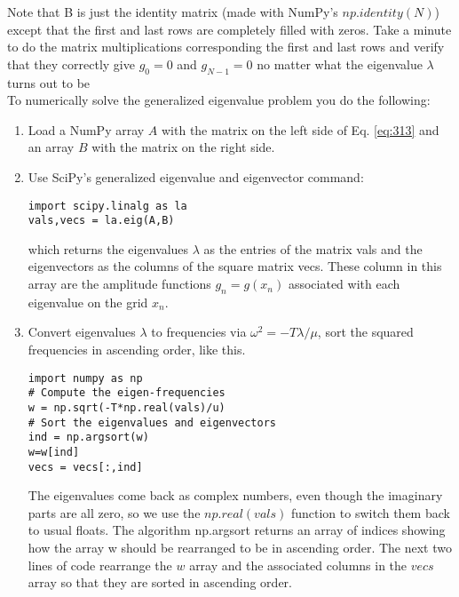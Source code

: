 Note that B is just the identity matrix (made with NumPy\rq s $np.identity(N)$)
except that the first and last rows are completely filled with zeros. Take a minute
to do the matrix multiplications corresponding the first and last rows and verify
that they correctly give $g_0 = 0$ and $g_{N−1} = 0$ no matter what the eigenvalue $\lambda$ turns
out to be \\ 
	To numerically solve the generalized eigenvalue problem you do the following:
	\begin{enumerate}
		\item Load a NumPy array $A$ with the matrix on the left side of Eq. \eqref{eq:313} and an
array $B$ with the matrix on the right side.
\item Use SciPy\rq s generalized eigenvalue and eigenvector command:
\begin{lstlisting}
import scipy.linalg as la
vals,vecs = la.eig(A,B)
\end{lstlisting}
which returns the eigenvalues $\lambda$ as the entries of the matrix vals and the
eigenvectors as the columns of the square matrix vecs. These column
in this array are the amplitude functions $g_n = g(x_n)$ associated with each
eigenvalue on the grid $x_n$.
\item Convert eigenvalues $\lambda$ to frequencies via $\omega^2 = −T \lambda/\mu$, sort the squared
frequencies in ascending order, like this.
\begin{lstlisting}
import numpy as np
# Compute the eigen-frequencies
w = np.sqrt(-T*np.real(vals)/u)
# Sort the eigenvalues and eigenvectors
ind = np.argsort(w)
w=w[ind]
vecs = vecs[:,ind]
\end{lstlisting}
The eigenvalues come back as complex numbers, even though the imaginary parts are all zero, so we use the $np.real(vals)$ function to switch
them back to usual floats. The algorithm np.argsort returns an array of
indices showing how the array w should be rearranged to be in ascending
order. The next two lines of code rearrange the $w$ array and the associated
columns in the $vecs$ array so that they are sorted in ascending order.


	\end{enumerate}
	
